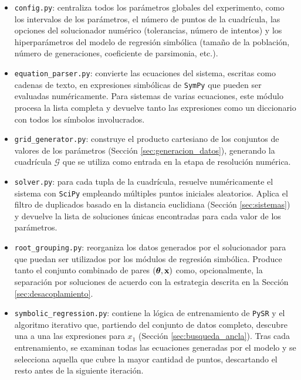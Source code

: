 \begin{itemize} \item \texttt{config.py}: centraliza todos los parámetros globales del experimento, como los intervalos de los parámetros, el número de puntos de la cuadrícula, las opciones del solucionador numérico (tolerancias, número de intentos) y los hiperparámetros del modelo de regresión simbólica (tamaño de la población, número de generaciones, coeficiente de parsimonia, etc.).

    \item \texttt{equation\_parser.py}: convierte las ecuaciones del sistema, escritas como cadenas de texto, en expresiones simbólicas de \texttt{SymPy} \cite{sympy} que pueden ser evaluadas numéricamente. Para sistemas de varias ecuaciones, este módulo procesa la lista completa y devuelve tanto las expresiones como un diccionario con todos los símbolos involucrados.

    \item \texttt{grid\_generator.py}: construye el producto cartesiano de los conjuntos de valores de los parámetros (Sección \ref{sec:generacion_datos}), generando la cuadrícula \(\mathcal{G}\) que se utiliza como entrada en la etapa de resolución numérica.

    \item \texttt{solver.py}: para cada tupla de la cuadrícula, resuelve numéricamente el sistema con \texttt{SciPy} \cite{virtanen2020scipy} empleando múltiples puntos iniciales aleatorios. Aplica el filtro de duplicados basado en la distancia euclidiana (Sección \ref{sec:sistemas}) y devuelve la lista de soluciones únicas encontradas para cada valor de los parámetros.

    \item \texttt{root\_grouping.py}: reorganiza los datos generados por el solucionador para que puedan ser utilizados por los módulos de regresión simbólica. Produce tanto el conjunto combinado de pares \((\boldsymbol{\theta}, \mathbf{x})\) como, opcionalmente, la separación por soluciones de acuerdo con la estrategia descrita en la Sección \ref{sec:desacoplamiento}.

    \item \texttt{symbolic\_regression.py}: contiene la lógica de entrenamiento de \texttt{PySR} \cite{cranmer2023pysr} y el algoritmo iterativo que, partiendo del conjunto de datos completo, descubre una a una las expresiones para \(x_1\) (Sección \ref{sec:busqueda_ancla}). Tras cada entrenamiento, se examinan todas las ecuaciones generadas por el modelo y se selecciona aquella que cubre la mayor cantidad de puntos, descartando el resto antes de la siguiente iteración.


\end{itemize}
